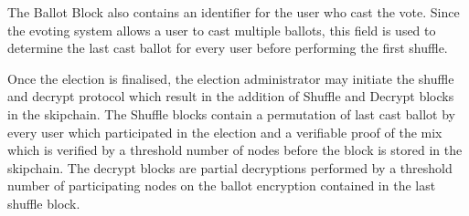 The Ballot Block also contains an identifier for the user who cast the vote. Since the evoting system allows a user to cast multiple ballots, this field is used to determine the last cast ballot for every user before performing the first shuffle.

Once the election is finalised, the election administrator may initiate the shuffle and decrypt protocol which result in the addition of Shuffle and Decrypt blocks in the skipchain. The Shuffle blocks contain a permutation of last cast ballot by every user which participated in the election and a verifiable proof of the mix which is verified by a threshold number of nodes before the block is stored in the skipchain. The decrypt blocks are partial decryptions performed by a threshold number of participating nodes on the ballot encryption contained in the last shuffle block.